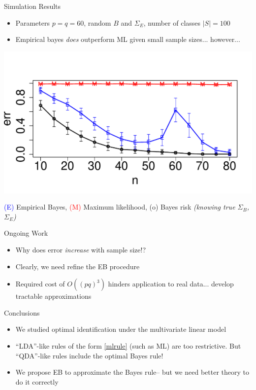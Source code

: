 \documentclass[final]{beamer}
\newlength{\onecolwid}
\begin{document}
\begin{frame}[t]
\begin{columns}[t]
\begin{column}{\onecolwid}
\begin{block}{Simulation Results}
\begin{itemize}
\item Parameters $p = q = 60$, random $B$ and $\Sigma_E$, number of classes $|S| = 100$
\item Empirical bayes \emph{does} outperform ML given small sample sizes... however...
\end{itemize}
\begin{center}
\includegraphics[scale = 1.3, trim = 0in 0in 0in 0.5in]{simulation1.pdf}
\end{center}
\small{
 \textcolor{blue}{(E)} Empirical Bayes,  \textcolor{red}{(M)} Maximum likelihood,
(o) Bayes risk \emph{(knowing true $\Sigma_B$, $\Sigma_E$)}}
\end{block}

\begin{block}{Ongoing Work}
\begin{itemize}
\item Why does error \emph{increase} with sample size!?
\item Clearly, we need refine the EB procedure
\item Required cost of $O((pq)^3)$ hinders application to real data... develop tractable approximations
\end{itemize}
\end{block}


\begin{block}{Conclusions}
\begin{itemize}
\item We studied optimal identification under the multivariate linear model
\item ``LDA''-like rules of the form \eqref{mlrule} (such as ML) are too restrictive.
But ``QDA''-like rules include the optimal Bayes rule!
\item We propose EB to approximate the Bayes rule-- but we need better theory to do it correctly
\end{itemize}
\end{block}


\end{column}
\end{columns}
\end{frame}
\end{document}
